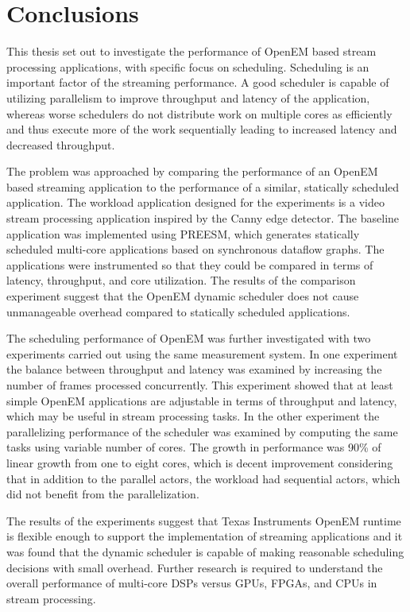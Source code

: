\chapter{Conclusions}
\label{chapter:conclusion}
This thesis set out to investigate the performance of OpenEM based stream processing applications, with specific focus on scheduling. Scheduling is an important factor of the streaming performance. A good scheduler is capable of utilizing parallelism to improve throughput and latency of the application, whereas worse schedulers do not distribute work on multiple cores as efficiently and thus execute more of the work sequentially leading to increased latency and decreased throughput.

The problem was approached by comparing the performance of an OpenEM based streaming application to the performance of a similar, statically scheduled application. The workload application designed for the experiments is a video stream processing application inspired by the Canny edge detector. The baseline application was implemented using PREESM, which generates statically scheduled multi-core applications based on synchronous dataflow graphs. The applications were instrumented so that they could be compared in terms of latency, throughput, and core utilization. The results of the comparison experiment suggest that the OpenEM dynamic scheduler does not cause unmanageable overhead compared to statically scheduled applications.

The scheduling performance of OpenEM was further investigated with two experiments carried out using the same measurement system. In one experiment the balance between throughput and latency was examined by increasing the number of frames processed concurrently. This experiment showed that at least simple OpenEM applications are adjustable in terms of throughput and latency, which may be useful in stream processing tasks. In the other experiment the parallelizing performance of the scheduler was examined by computing the same tasks using variable number of cores. The growth in performance was 90\% of linear growth from one to eight cores, which is decent improvement considering that in addition to the parallel actors, the workload had sequential actors, which did not benefit from the parallelization.

The results of the experiments suggest that Texas Instruments OpenEM runtime is flexible enough to support the implementation of streaming applications and it was found that the dynamic scheduler is capable of making reasonable scheduling decisions with small overhead. Further research is required to understand the overall performance of multi-core DSPs versus GPUs, FPGAs, and CPUs in stream processing.

